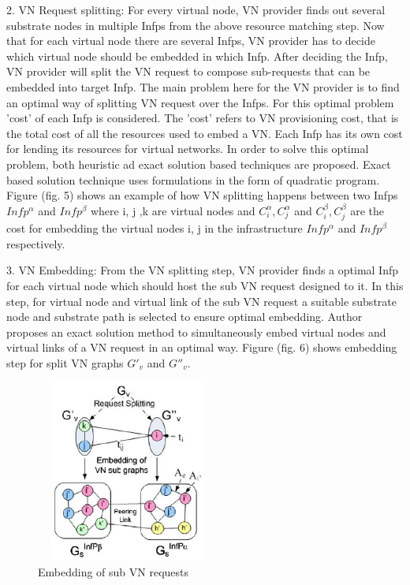 \documentclass[article,dr=phil,type=msc ,colorback,accentcolor=tud4b]{tudthesis}
\begin{document}
2. VN Request splitting: For every virtual node, VN provider finds out several substrate nodes in multiple Infps from the above resource matching step. Now that for each virtual node there are several Infps, VN provider has to decide which virtual node should be embedded in which Infp. After deciding the Infp, VN provider will split the VN request to compose sub-requests that can be embedded into target Infp. The main problem here for the VN provider is to find an optimal way of splitting VN request over the Infps. For this optimal problem 'cost' of each Infp is considered. The 'cost' refers to VN provisioning cost, that is the total cost of all the resources used to embed a VN. Each Infp has its own cost for lending its resources for virtual networks. In order to solve this optimal problem, both heuristic ad exact solution based techniques are proposed. Exact based solution technique uses formulations in the form of quadratic program. Figure (fig. 5) shows an example of how VN splitting happens between two Infps $Infp^{\alpha}$ and $Infp^{\beta}$ where i, j ,k are virtual nodes and $C_{i}^{\alpha}, C_{j}^{\alpha}$ and $C_{i}^{\beta}, C_{j}^{\beta}$ are the cost for embedding the virtual nodes i, j in the infrastructure $Infp^{\alpha}$ and $Infp^{\beta}$ respectively.\newline

3. VN Embedding: From the VN splitting step, VN provider finds a optimal Infp for each virtual node which should host the sub VN request designed to it. In this step, for virtual node and virtual link of the sub VN request a suitable substrate node and substrate path is selected to ensure optimal embedding. Author proposes an exact solution method to simultaneously embed virtual nodes and virtual links of a VN request in an optimal way. Figure (fig. 6) shows embedding step for split VN graphs $G'_{v}$ and $G''_{v}$.

\begin{figure}[h]
	\centering
	\includegraphics[width=6cm, height=6cm]{vn_embedding.jpg}
	\caption{Embedding of sub VN requests}
	\label{fig: VN embedding}
\end{figure}
\end{document}
